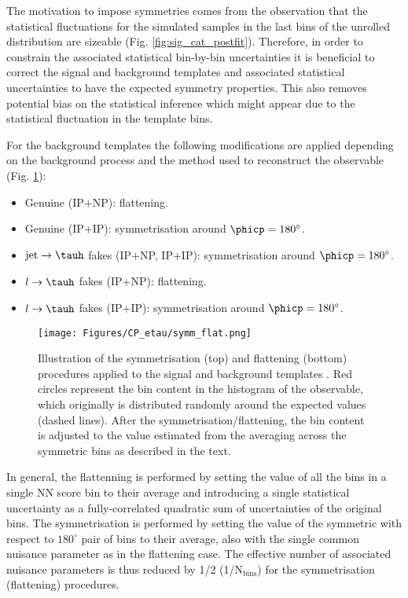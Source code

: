 The motivation to impose symmetries comes from the observation that the statistical fluctuations for the simulated samples in the last bins of the unrolled \phicp distribution are sizeable (Fig. \ref{fig:sig_cat_postfit}). Therefore, in order to constrain the associated statistical bin-by-bin uncertainties it is beneficial to correct the signal and background templates and associated statistical uncertainties to have the expected symmetry properties. This also removes potential bias on the statistical inference which might appear due to the statistical fluctuation in the template bins.

For the background templates the following modifications are applied depending on the background process and the method used to reconstruct the \phicp observable (Fig. \ref{fig:symm_flat}):
\begin{itemize}
    \item Genuine \tauh (IP+NP): flattening.
    \item Genuine \tauh (IP+IP): symmetrisation around $\phicp=180^\circ$.
    \item $\text{jet} \to \tauh$ fakes (IP+NP, IP+IP): symmetrisation around $\phicp=180^\circ$.
    \item $l \to \tauh$ fakes (IP+NP): flattening.
    \item $l \to \tauh$ fakes (IP+IP): symmetrisation around $\phicp=180^\circ$.
\end{itemize}

\begin{figure}[!t]
    \centering
    \texttt{[image: Figures/CP\_etau/symm\_flat.png]}
    \caption{Illustration of the symmetrisation (top) and flattening (bottom) procedures applied to the signal and background templates \cite{Cardini:2021hbb}. Red circles represent the bin content in the histogram of the \phicp observable, which originally is distributed randomly around the expected values (dashed lines). After the symmetrisation/flattening, the bin content is adjusted to the value estimated from the averaging across the symmetric bins as described in the text.}\label{fig:symm_flat}
\end{figure}

In general, the flattenning is performed by setting the value of all the \phicp bins in a single NN score bin to their average and introducing a single statistical uncertainty as a fully-correlated quadratic sum of uncertainties of the original bins. The symmetrisation is performed by setting the value of the symmetric with respect to $180^\circ$ pair of bins to their average, also with the single common nuisance parameter as in the flattening case. The effective number of associated nuisance parameters is thus reduced by 1/2 (1/$\text{N}_\text{bins}$) for the symmetrisation (flattening) procedures.

